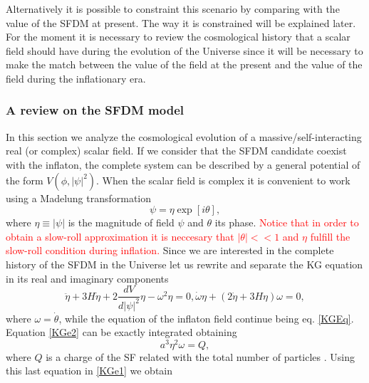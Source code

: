 \documentclass[amssymb,twocolumn,prd,nofootinbib,showpacs]{revtex4-1}
\begin{document}
Alternatively it is possible to constraint this scenario by comparing with the value of the SFDM at present. The way it is constrained will be explained later. For the moment it is necessary to review the cosmological history that a scalar field should have during the evolution of the Universe since it will be necessary to make the match between the value of the field at the present and the value of the field during the inflationary era. 

\subsubsection{A review on the SFDM model}

In this section we analyze the cosmological evolution of a massive/self-interacting real (or complex) scalar field. If we consider that the SFDM candidate coexist with the inflaton, the complete system can be described by a general potential of the form $V(\phi,|\psi|^2)$. When the scalar field is complex it is convenient to work using a Madelung transformation \cite{madelung}
\begin{equation}
\psi = \eta \exp[i\theta],
\end{equation}
where $\eta\equiv |\psi|$ is the magnitude of field $\psi$ and $\theta$ its phase. 
\textcolor{red}{Notice that in order to obtain a slow-roll approximation it is neccesary that $|\theta|<<1$ and $\eta$ fulfill the slow-roll condition during inflation.} 
Since we are interested in the complete history of the SFDM in the Universe let us rewrite and separate the KG equation in its real and imaginary components
\begin{subequations}\label{KESFDM}
\begin{equation}\label{KGe1}
\ddot\eta+3H\dot\eta+2\frac{dV}{d|\psi|^2}\eta-\omega^2\eta= 0,
\end{equation}
\begin{equation}\label{KGe2}
\dot\omega \eta + (2\dot\eta+3H\eta)\omega=0,
\end{equation}
\end{subequations}
where $\omega = \dot \theta$, while the equation of the inflaton field continue being eq. \eqref{KGEq}. Equation \eqref{KGe2} can be exactly integrated obtaining 
\begin{equation}
a^3\eta^2\omega=Q,
\end{equation}
where $Q$ is a charge of the SF related with the total number of particles \cite{SFphi42,charge1,charge2,charge3,charge4}. Using this last equation in \eqref{KGe1} we obtain
\end{document}
